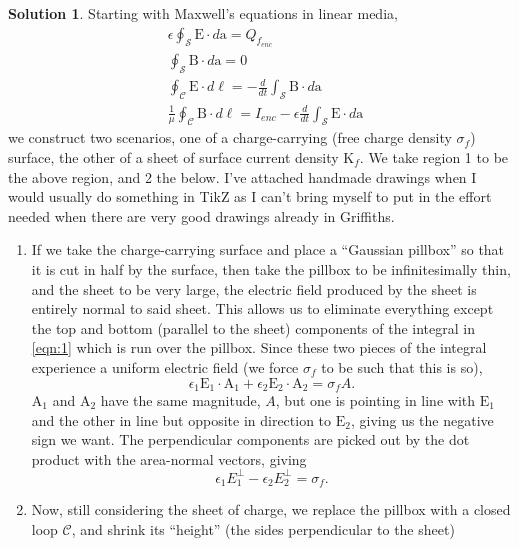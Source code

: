 \documentclass[10pt]{article}
\theoremstyle{definition}
\newtheorem{soln}{Solution}
\newcommand{\bv}[1]{\bm{\mathrm{#1}}}
\begin{document}
\begin{soln}
  Starting with Maxwell's equations in linear media,
  \begin{align}
     & \epsilon\oint_\mathcal{S}\bv{E}\cdot d\bv{a}=Q_{f_{enc}}\label{eqn:1}                                                             \\
     & \oint_\mathcal{S}\bv{B}\cdot d\bv{a}=0\label{eqn:2}                                                                               \\
     & \oint_\mathcal{C}\bv{E}\cdot d\bv{\ell}=-\frac{d}{dt}\int_\mathcal{S}\bv{B}\cdot d\bv{a}\label{eqn:3}                             \\
     & \frac{1}{\mu}\oint_\mathcal{C}\bv{B}\cdot d\bv{\ell}=I_{enc}-\epsilon\frac{d}{dt}\int_\mathcal{S}\bv{E}\cdot d\bv{a}\label{eqn:4}
  \end{align}
  we construct two scenarios, one of a charge-carrying
  (free charge density $\sigma_f$) surface, the other of a sheet of surface current density $\bv{K}_f$. We take region 1 to be the above region,
  and 2 the below.
  I've attached handmade drawings when I would usually do something in TikZ as I can't bring myself to put in the effort needed when there are 
  very good drawings already in Griffiths.
  \begin{enumerate}[label=(\alph*)]
    \item If we take the charge-carrying surface and place a ``Gaussian pillbox'' so that it is cut in half by the surface, then take the pillbox
          to be infinitesimally thin, and the sheet to be very large, the electric field produced by the sheet is entirely normal
          to said sheet. This allows us to eliminate everything except the top and bottom (parallel to the sheet) components of the integral in \cref{eqn:1}
          which is run over the pillbox. Since these two pieces of the integral experience a uniform electric field (we force $\sigma_f$ to be such that this is so),
          $$\epsilon_1\bv{E}_1\cdot\bv{A}_1+\epsilon_2\bv{E}_2\cdot\bv{A}_2=\sigma_f A.$$
          $\bv{A}_1$ and $\bv{A}_2$ have the same magnitude, $A$, but one is pointing in line with $\bv{E}_1$ and the other in line but opposite in direction to
          $\bv{E}_2$, giving us the negative sign we want. The perpendicular components are picked out by the dot product with the area-normal vectors, giving
          $$\epsilon_1E_1^\perp-\epsilon_2E_2^\perp=\sigma_f.$$
    \item Now, still considering the sheet of charge, we replace the pillbox with a closed loop $\mathcal{C}$, and shrink its ``height'' (the sides perpendicular to the sheet)

\end{enumerate}
\end{soln}
\end{document}
